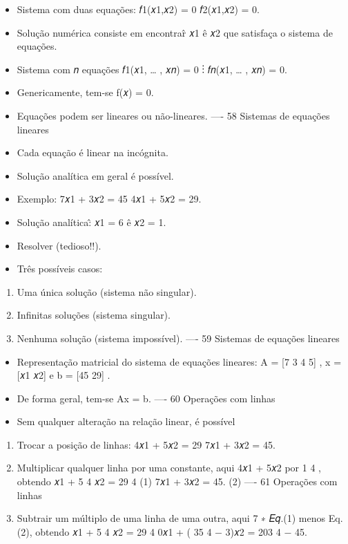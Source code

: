 \documentclass[
]{article}
\providecommand{\tightlist}{%
  \setlength{\itemsep}{0pt}\setlength{\parskip}{0pt}}
\begin{document}
\begin{itemize}
\tightlist
\item
  Sistema com duas equações: 𝑓1(𝑥1,𝑥2) = 0 𝑓2(𝑥1,𝑥2) = 0.
\item
  Solução numérica consiste em encontrar̂ 𝑥1 ê 𝑥2 que satisfaça o sistema
  de equações.
\item
  Sistema com 𝑛 equações 𝑓1(𝑥1, \ldots{} , 𝑥𝑛) = 0 ⋮ 𝑓𝑛(𝑥1, \ldots{} ,
  𝑥𝑛) = 0.
\item
  Genericamente, tem-se f(𝑥) = 0.
\item
  Equações podem ser lineares ou não-lineares. ---- 58 Sistemas de
  equações lineares
\item
  Cada equação é linear na incógnita.
\item
  Solução analítica em geral é possível.
\item
  Exemplo: 7𝑥1 + 3𝑥2 = 45 4𝑥1 + 5𝑥2 = 29.
\item
  Solução analítica:̂ 𝑥1 = 6 ê 𝑥2 = 1.
\item
  Resolver (tedioso!!).
\item
  Três possíveis casos:
\end{itemize}

\begin{enumerate}
\def\labelenumi{\arabic{enumi}.}
\tightlist
\item
  Uma única solução (sistema não singular).
\item
  Infinitas soluções (sistema singular).
\item
  Nenhuma solução (sistema impossível). ---- 59 Sistemas de equações
  lineares
\end{enumerate}

\begin{itemize}
\tightlist
\item
  Representação matricial do sistema de equações lineares: A = {[}7 3 4
  5{]} , x = {[}𝑥1 𝑥2{]} e b = {[}45 29{]} .
\item
  De forma geral, tem-se Ax = b. ---- 60 Operações com linhas
\item
  Sem qualquer alteração na relação linear, é possível
\end{itemize}

\begin{enumerate}
\def\labelenumi{\arabic{enumi}.}
\tightlist
\item
  Trocar a posição de linhas: 4𝑥1 + 5𝑥2 = 29 7𝑥1 + 3𝑥2 = 45.
\item
  Multiplicar qualquer linha por uma constante, aqui 4𝑥1 + 5𝑥2 por 1 4 ,
  obtendo 𝑥1 + 5 4 𝑥2 = 29 4 (1) 7𝑥1 + 3𝑥2 = 45. (2) ---- 61 Operações
  com linhas
\item
  Subtrair um múltiplo de uma linha de uma outra, aqui 7 ∗ 𝐸𝑞.(1) menos
  Eq. (2), obtendo 𝑥1 + 5 4 𝑥2 = 29 4 0𝑥1 + ( 35 4 − 3)𝑥2 = 203 4 − 45.
\end{enumerate}
\end{document}
